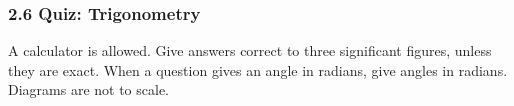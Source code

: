 \documentclass[12pt, twoside]{article}
\begin{document}
\newpage

\subsubsection*{2.6 Quiz: Trigonometry}

\begin{center}
\end{center}

A calculator is allowed. Give answers correct to three significant figures,
unless they are exact. When a question gives an angle in radians, give
angles in radians. Diagrams are not to scale.
\end{document}
